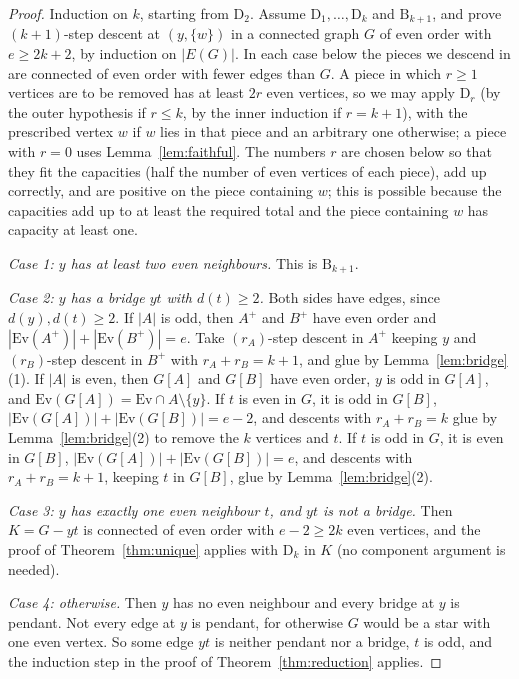 \documentclass[11pt]{amsart}
\theoremstyle{definition}
\newcommand{\Ev}{\mathrm{Ev}}
\begin{document}
\begin{proof}
Induction on $k$, starting from $\mathrm{D}_2$. Assume $\mathrm{D}_1,\dots,\mathrm{D}_{k}$ and
$\mathrm{B}_{k+1}$, and prove $(k+1)$-step descent at $(y,\{w\})$ in a connected graph $G$ of even
order with $e\ge2k+2$, by induction on $|E(G)|$. In each case below the pieces we descend in are
connected of even order with fewer edges than $G$. A piece in which $r\ge1$ vertices are to be removed
has at least $2r$ even vertices, so we may apply $\mathrm{D}_r$ (by the outer hypothesis if $r\le k$, by
the inner induction if $r=k+1$), with the prescribed vertex $w$ if $w$ lies in that piece and an
arbitrary one otherwise; a piece with $r=0$ uses Lemma~\ref{lem:faithful}. The numbers $r$ are chosen
below so that they fit the capacities (half the number of even vertices of each piece), add up
correctly, and are positive on the piece containing $w$; this is possible because the capacities add
up to at least the required total and the piece containing $w$ has capacity at least one.

\emph{Case 1: $y$ has at least two even neighbours.} This is $\mathrm{B}_{k+1}$.

\emph{Case 2: $y$ has a bridge $yt$ with $d(t)\ge2$.} Both sides have edges, since $d(y),d(t)\ge2$.
If $|A|$ is odd, then $A^+$ and $B^+$ have even order and $|\Ev(A^+)|+|\Ev(B^+)|=e$. Take
$(r_A)$-step descent in $A^+$ keeping $y$ and $(r_B)$-step descent in $B^+$ with $r_A+r_B=k+1$, and
glue by Lemma~\ref{lem:bridge}(1). If $|A|$ is even, then $G[A]$ and $G[B]$ have even order, $y$ is odd
in $G[A]$, and $\Ev(G[A])=\Ev\cap A\setminus\{y\}$. If $t$ is even in $G$, it is odd in $G[B]$,
$|\Ev(G[A])|+|\Ev(G[B])|=e-2$, and descents with $r_A+r_B=k$ glue by Lemma~\ref{lem:bridge}(2) to
remove the $k$ vertices and $t$. If $t$ is odd in $G$, it is even in $G[B]$,
$|\Ev(G[A])|+|\Ev(G[B])|=e$, and descents with $r_A+r_B=k+1$, keeping $t$ in $G[B]$, glue by
Lemma~\ref{lem:bridge}(2).

\emph{Case 3: $y$ has exactly one even neighbour $t$, and $yt$ is not a bridge.} Then $K=G-yt$ is
connected of even order with $e-2\ge2k$ even vertices, and the proof of Theorem~\ref{thm:unique} applies
with $\mathrm{D}_k$ in $K$ (no component argument is needed).

\emph{Case 4: otherwise.} Then $y$ has no even neighbour and every bridge at $y$ is pendant. Not every
edge at $y$ is pendant, for otherwise $G$ would be a star with one even vertex. So some edge $yt$ is
neither pendant nor a bridge, $t$ is odd, and the induction step in the proof of
Theorem~\ref{thm:reduction} applies.
\end{proof}
\end{document}
